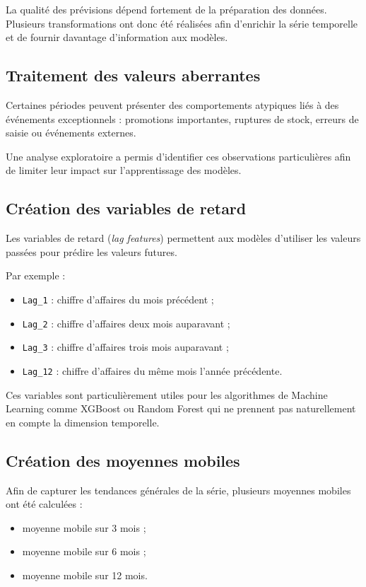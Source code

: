 \documentclass[12pt,a4paper,twoside]{report}
\begin{document}
La qualité des prévisions dépend fortement de la préparation des données. Plusieurs transformations ont donc été réalisées afin d'enrichir la série temporelle et de fournir davantage d'information aux modèles.

\subsection{Traitement des valeurs aberrantes}

Certaines périodes peuvent présenter des comportements atypiques liés à des événements exceptionnels : promotions importantes, ruptures de stock, erreurs de saisie ou événements externes.

Une analyse exploratoire a permis d'identifier ces observations particulières afin de limiter leur impact sur l'apprentissage des modèles.

\subsection{Création des variables de retard}

Les variables de retard (\textit{lag features}) permettent aux modèles d'utiliser les valeurs passées pour prédire les valeurs futures.

Par exemple :

\begin{itemize}
    \item \texttt{Lag\_1} : chiffre d'affaires du mois précédent ;
    \item \texttt{Lag\_2} : chiffre d'affaires deux mois auparavant ;
    \item \texttt{Lag\_3} : chiffre d'affaires trois mois auparavant ;
    \item \texttt{Lag\_12} : chiffre d'affaires du même mois l'année précédente.
\end{itemize}

Ces variables sont particulièrement utiles pour les algorithmes de Machine Learning comme XGBoost ou Random Forest qui ne prennent pas naturellement en compte la dimension temporelle.

\subsection{Création des moyennes mobiles}

Afin de capturer les tendances générales de la série, plusieurs moyennes mobiles ont été calculées :

\begin{itemize}
    \item moyenne mobile sur 3 mois ;
    \item moyenne mobile sur 6 mois ;
    \item moyenne mobile sur 12 mois.
\end{itemize}
\end{document}
